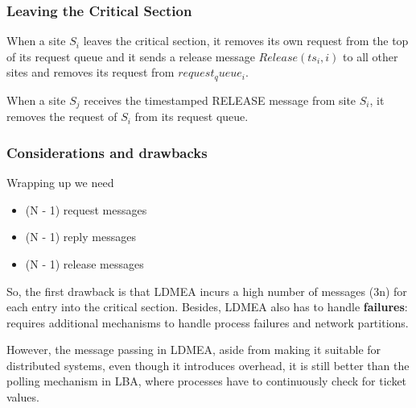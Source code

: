 \subsubsection{Leaving the Critical Section}
When a site $S_i$ leaves the critical section, it removes its own request from the top of its request queue and it sends a release message $Release(ts_i, i)$ to all other sites and removes its request from $request_queue_i$.

When a site $S_j$ receives the timestamped RELEASE message from site $S_i$, it removes the request of $S_i$ from its request queue.

\subsubsection{Considerations and drawbacks}

Wrapping up we need
\begin{itemize}
   \item (N - 1) request messages
   \item (N - 1) reply messages
   \item (N - 1) release messages
\end{itemize}
So, the first drawback is that LDMEA incurs a high number of messages (3n) for each entry into the critical section. 
Besides, LDMEA also has to handle \textbf{failures}: requires additional mechanisms to handle process failures and network partitions.

However, the message passing in LDMEA, aside from making it suitable for distributed systems, even though it introduces overhead, it is still better than the polling mechanism in LBA, where processes have to continuously check for ticket values.